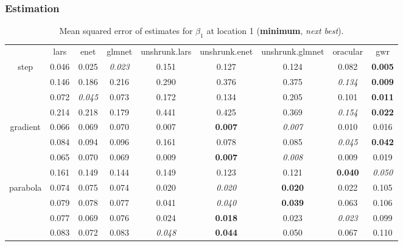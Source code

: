 \documentclass[authoryear, review, 11pt]{elsarticle}
\begin{document}
		\subsubsection{Estimation}
		\begin{table}[ht]
		\begin{center}
		\begin{tabular}{ccccccccc}
		  & lars & enet & glmnet & unshrunk.lars & unshrunk.enet & unshrunk.glmnet & oracular & gwr \\ 
		  \cline{2-9}
		  \multirow{4}{*}{step} & 0.046 & 0.025 & \emph{0.023} & 0.151 & 0.127 & 0.124 & 0.082 & \textbf{0.005} \\ 
		  & 0.146 & 0.186 & 0.216 & 0.290 & 0.376 & 0.375 & \emph{0.134} & \textbf{0.009} \\ 
		  & 0.072 & \emph{0.045} & 0.073 & 0.172 & 0.134 & 0.205 & 0.101 & \textbf{0.011} \\ 
		  & 0.214 & 0.218 & 0.179 & 0.441 & 0.425 & 0.369 & \emph{0.154} & \textbf{0.022} \\ 
		  \cline{2-9}
		  \multirow{4}{*}{gradient} & 0.066 & 0.069 & 0.070 & 0.007 & \textbf{0.007} & \emph{0.007} & 0.010 & 0.016 \\ 
		  & 0.084 & 0.094 & 0.096 & 0.161 & 0.078 & 0.085 & \emph{0.045} & \textbf{0.042} \\ 
		  & 0.065 & 0.070 & 0.069 & 0.009 & \textbf{0.007} & \emph{0.008} & 0.009 & 0.019 \\ 
		  & 0.161 & 0.149 & 0.144 & 0.149 & 0.123 & 0.121 & \textbf{0.040} & \emph{0.050} \\ 
		  \cline{2-9}
		  \multirow{4}{*}{parabola} & 0.074 & 0.075 & 0.074 & 0.020 & \emph{0.020} & \textbf{0.020} & 0.022 & 0.105 \\ 
		  & 0.079 & 0.078 & 0.077 & 0.041 & \emph{0.040} & \textbf{0.039} & 0.063 & 0.106 \\ 
		  & 0.077 & 0.069 & 0.076 & 0.024 & \textbf{0.018} & 0.023 & \emph{0.023} & 0.099 \\ 
		  & 0.083 & 0.072 & 0.083 & \emph{0.048} & \textbf{0.044} & 0.050 & 0.067 & 0.110 \\ 
		  \end{tabular}
		\caption{Mean squared error of estimates for $\beta_1$ at location 1 (\textbf{minimum}, \emph{next best}).\label{table:loc1-X1-MSEX}}
		\end{center}
		\end{table}
		
\end{document}
